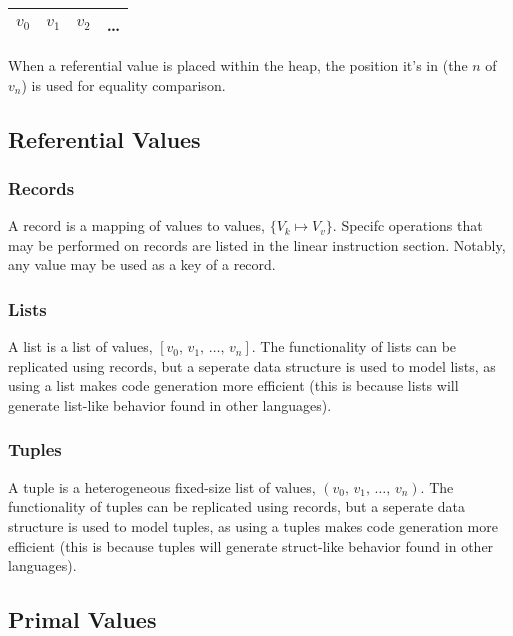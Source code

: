\documentclass[twocolumn]{article}
\begin{document}
\begin{center}
  \begin{tabular}{ |c|c|c|c| }
    \hline
    $v_0$ & $v_1$ & $v_2$ & \dots \\
    \hline
  \end{tabular}
\end{center}

When a referential value is placed within the heap, the position it's in (the $n$ of $v_n$)
is used for equality comparison.

\subsection{Referential Values}

\subsubsection{Records}

A record is a mapping of values to values, \(\{ V_k \mapsto V_v \}\). Specifc operations
that may be performed on records are listed in the linear instruction section. Notably,
any value may be used as a key of a record.

\subsubsection{Lists}

A list is a list of values, \([ v_0,\, v_1,\, \dots,\, v_n ]\). The functionality
of lists can be replicated using records, but a seperate data structure is used
to model lists, as using a list makes code generation more efficient (this is
because lists will generate list-like behavior found in other languages).

\subsubsection{Tuples}

A tuple is a heterogeneous fixed-size list of values, \((v_0,\, v_1,\, \dots,\, v_n)\).
The functionality of tuples can be replicated using records, but a seperate data
structure is used to model tuples, as using a tuples makes code generation more
efficient (this is because tuples will generate struct-like behavior found in other
languages).

\subsection{Primal Values}
\end{document}
